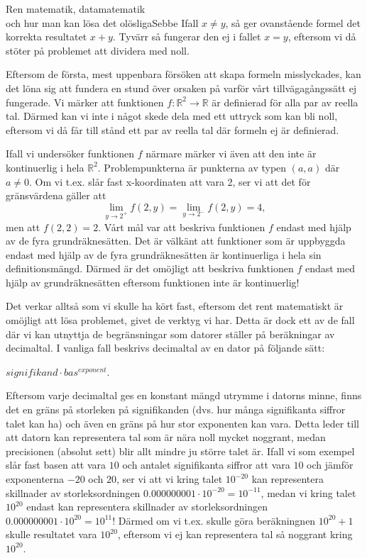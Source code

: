 \documentclass{spektraklet}
\begin{document}
\begin{artikel}{Ren matematik, datamatematik \\ och hur man kan lösa det olösliga}{Sebbe}
Ifall $ x \neq y$, så ger ovanstående formel det korrekta resultatet $ x + y$. Tyvärr så fungerar den ej i fallet $ x = y$, eftersom vi då stöter på problemet att dividera med noll.

Eftersom de första, mest uppenbara försöken att skapa formeln misslyckades, kan det löna sig att fundera en stund över orsaken på varför vårt tillvägagångssätt ej fungerade. Vi märker att funktionen $ f\colon \mathbb{R}^2 \rightarrow \mathbb{R}$ är definierad för alla par av reella tal. Därmed kan vi inte i något skede dela med ett uttryck som kan bli noll, eftersom vi då får till stånd ett par av reella tal där formeln ej är definierad.

Ifall vi undersöker funktionen $ f$ närmare märker vi även att den inte är kontinuerlig i hela $ \mathbb{R}^2$. Problempunkterna är punkterna av typen $ (a,a)$ där $ a \neq 0$. Om vi t.ex. slår fast x-koordinaten att vara 2, ser vi att det för gränsvärdena gäller att $$ \lim\limits_{y \to 2^{+}} f(2,y) = \lim\limits_{y \to 2^{-}} f(2,y) = 4,$$ men att $ f(2,2) = 2$. Vårt mål var att beskriva funktionen $ f$ endast med hjälp av de fyra grundräknesätten. Det är välkänt att funktioner som är uppbyggda endast med hjälp av de fyra grundräknesätten är kontinuerliga i hela sin definitionsmängd. Därmed är det omöjligt att beskriva funktionen $ f$ endast med hjälp av grundräknesätten eftersom funktionen inte är kontinuerlig!

Det verkar alltså som vi skulle ha kört fast, eftersom det rent matematiskt är omöjligt att lösa problemet, givet de verktyg vi har. Detta är dock ett av de fall där vi kan utnyttja de begränsningar som datorer ställer på beräkningar av decimaltal. I vanliga fall beskrivs decimaltal av en dator på följande sätt:

$ signifikand \cdot bas^{exponent}$.

Eftersom varje decimaltal ges en konstant mängd utrymme i datorns minne, finns det en gräns på storleken på signifikanden (dvs. hur många signifikanta siffror talet kan ha) och även en gräns på hur stor exponenten kan vara. Detta leder till att datorn kan representera tal som är nära noll mycket noggrant, medan precisionen (absolut sett) blir allt mindre ju större talet är. Ifall vi som exempel slår fast basen att vara $ 10$ och antalet signifikanta siffror att vara $ 10$ och jämför exponenterna $ -20$ och $ 20$, ser vi att vi kring talet $ 10^{-20}$ kan representera skillnader av storleksordningen $ 0.000000001 \cdot 10^{-20} = 10^{-11}$, medan vi kring talet $ 10^{20}$ endast kan representera skillnader av storleksordningen $ 0.000000001 \cdot 10^{20} = 10^{11}$! Därmed om vi t.ex. skulle göra beräkningnen $ 10^{20} + 1$ skulle resultatet vara $ 10^{20}$, eftersom vi ej kan representera tal så noggrant kring $ 10^{20}$.


\end{artikel}
\end{document}
